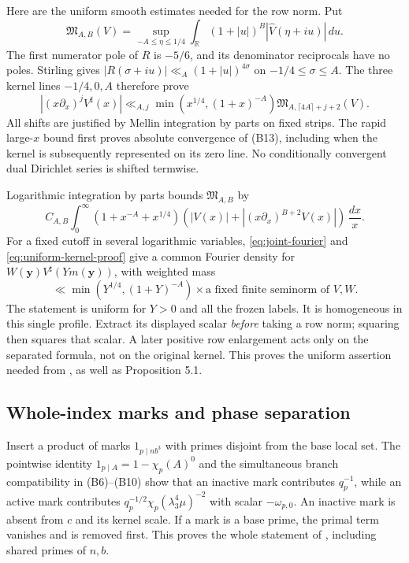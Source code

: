 \documentclass[12pt]{article}
\begin{document}
Here are the uniform smooth estimates needed for the row norm.
Put
\[
 {\mathfrak M}_{A,B}(V)=
 \sup_{-A\le\eta\le1/4}\int_{\mathbb R}
                  (1+|u|)^B|\widehat V(\eta+iu)|\,du.
\]
The first numerator pole of \(R\) is \(-5/6\), and its
denominator reciprocals have no poles.
Stirling gives \(|R(\sigma+iu)|\ll_A(1+|u|)^{4\sigma}\)
on \(-1/4\le\sigma\le A\).
The three kernel lines \(-1/4,0,A\) therefore prove
\[
 |(x\partial_x)^jV^\sharp(x)|
 \ll_{A,j}\min(x^{1/4},(1+x)^{-A})
                      {\mathfrak M}_{A,\lceil4A\rceil+j+2}(V).
 \tag{B14}\label{eq:uniform-kernel-proof}
\]
All shifts are justified by Mellin integration by parts on fixed
strips.  The rapid large-\(x\) bound first proves absolute
convergence of (B13), including when the kernel is subsequently
represented on its zero line.  No conditionally convergent dual
Dirichlet series is shifted termwise.

Logarithmic integration by parts bounds
\({\mathfrak M}_{A,B}\) by
\[
 C_{A,B}\int_0^\infty
 (1+x^{-A}+x^{1/4})
       (|V(x)|+|(x\partial_x)^{B+2}V(x)|)\,\frac{dx}{x}.
\]
For a fixed cutoff in several logarithmic variables,
\eqref{eq:joint-fourier} and \eqref{eq:uniform-kernel-proof}
give a common Fourier density for
\(W(\mathbf y)V^\sharp(Ym(\mathbf y))\), with weighted mass
\[
 \ll \min(Y^{1/4},(1+Y)^{-A})
                 \times\text{a fixed finite seminorm of }V,W.
 \tag{B15}\label{eq:common-reflected-profile}
\]
The statement is uniform for \(Y>0\) and all the frozen labels.
It is homogeneous in this single profile.
Extract its displayed scalar \emph{before} taking a row norm;
squaring then squares that scalar.
A later positive row enlargement acts only on the separated
formula, not on the original kernel.
This proves the uniform assertion needed from
\cite[Lemmas 5.3--5.4]{QRH}, as well as Proposition 5.1.

\subsection{Whole-index marks and phase separation}

Insert a product of marks \(1_{p\mid nb^3}\) with primes
disjoint from the base local set.
The pointwise identity \(1_{p\mid A}=1-\chi_p(A)^0\) and
the simultaneous branch compatibility in (B6)--(B10) show that
an inactive mark contributes \(q_p^{-1}\), while an active
mark contributes \(q_p^{-1/2}\chi_p(\lambda_3^4\mu)^{-2}\)
with scalar \(-\omega_{p,0}\).
An inactive mark is absent from \(c\) and its kernel scale.
If a mark is a base prime, the primal term vanishes and is
removed first.  This proves the whole statement of
\cite[Corollary 14.1]{QRH}, including shared primes of \(n,b\).
\end{document}
